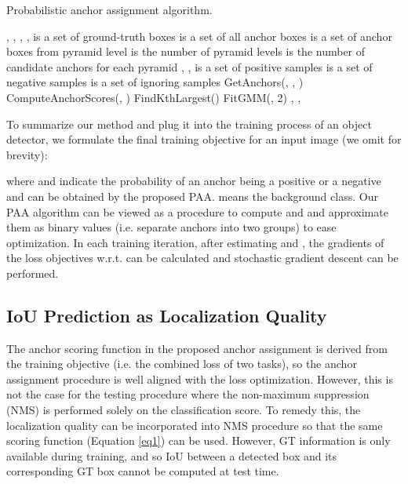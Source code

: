 \documentclass[runningheads]{llncs}
\begin{document}
\begin{algorithm} [tb]
	\caption{Probabilistic anchor assignment algorithm.}
	\label{alg1}
	\begin{algorithmic}[1]
		\REQUIRE , , , ,  \newline  is a set of ground-truth boxes \newline  is a set of all anchor boxes \newline  is a set of anchor boxes from  pyramid level \newline  is the number of pyramid levels \newline  is the number of candidate anchors for each pyramid
		\ENSURE , ,  \newline  is a set of positive samples \newline  is a set of negative samples \newline
		 is a set of ignoring samples
		\STATE 
		\FOR{}
		    \STATE  GetAnchors(, , ) 
		    \STATE 
    		\FOR{ \TO }
    		\STATE 
    		\STATE  ComputeAnchorScores(, ) 
    		\STATE  FindKthLargest()
    		\STATE 
    		\STATE 
    		\ENDFOR
    	\STATE  FitGMM(, 2) 
    	\STATE  {}
    	\STATE 
		\ENDFOR
		\STATE 
		\RETURN , , 
	\end{algorithmic}
\end{algorithm}

To summarize our method and plug it into the training process of an object detector, we formulate the final training objective for an input image  (we omit  for brevity):



where  and  indicate the probability of an anchor being a positive or a negative and can be obtained by the proposed PAA.  means the background class. Our PAA algorithm can be viewed as a procedure to compute  and  and approximate them as binary values (i.e. separate anchors into two groups) to ease optimization. In each training iteration, after estimating  and , the gradients of the loss objectives w.r.t.  can be calculated and stochastic gradient descent can be performed.

\subsection{IoU Prediction as Localization Quality}
The anchor scoring function in the proposed anchor assignment is derived from the training objective (i.e. the combined loss of two tasks), so the anchor assignment procedure is well aligned with the loss optimization. However, this is not the case for the testing procedure where the non-maximum suppression (NMS) is performed solely on the classification score. To remedy this, the localization quality can be incorporated into NMS procedure so that the same scoring function (Equation \ref{eq1}) can be used. However, GT information is only available during training, and so IoU between a detected box and its corresponding GT box cannot be computed at test time.
\end{document}

